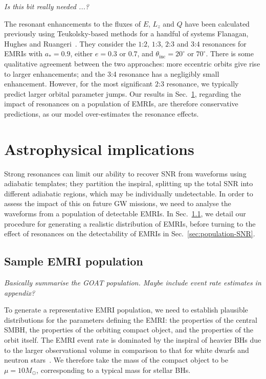 \documentclass[aps,prd,amsfonts,amssymb,amsmath,nofootinbib,showpacs,superscriptaddress,twocolumn]{revtex4}
\newcommand{\secref}[1]{Sec.~\ref{sec:#1}}
\newcommand{\sub}[1]{\ensuremath{_\mathrm{#1}}}
\begin{document}
\emph{Is this bit really needed ...?}

The resonant enhancements to the fluxes of $E$, $L_z$ and $Q$ have been calculated previously using Teukolsky-based methods for a handful of systems Flanagan, Hughes and Ruangeri~\cite{Flanagan2012a}. They consider the $1$:$2$, $1$:$3$, $2$:$3$ and $3$:$4$ resonances for EMRIs with $a_\ast=0.9$, either $e=0.3$ or $0.7$, and $\theta\sub{inc} = 20^\circ$ or $70^\circ$. There is some qualitative agreement between the two approaches: more eccentric orbits give rise to larger enhancements; and the 3:4 resonance has a negligibly small enhancement. However, for the most significant $2$:$3$ resonance, we typically predict larger orbital parameter jumps. Our results in \secref{astrophysics}, regarding the impact of resonances on a population of EMRIs, are therefore conservative predictions, as our model over-estimates the resonance effects.

\section{Astrophysical implications}
\label{sec:astrophysics}

Strong resonances can limit our ability to recover SNR from waveforms using adiabatic templates; they partition the inspiral, splitting up the total SNR into different adiabatic regions, which may be individually undetectable. In order to assess the impact of this on future GW missions, we need to analyse the waveforms from a population of detectable EMRIs. In \secref{EMRI-population}, we detail our procedure for generating a realistic distribution of EMRIs, before turning to the effect of resonances on the detectability of EMRIs in \secref{population-SNR}.

\subsection{Sample EMRI population}
\label{sec:EMRI-population}

\emph{Basically summarise the GOAT population. Maybe include event rate estimates in appendix?}

To generate a representative EMRI population, we need to establish plausible distributions for the parameters defining the EMRI: the properties of the central SMBH, the properties of the orbiting compact object, and the properties of the orbit itself. The EMRI event rate is dominated by the inspiral of heavier BHs due to the larger observational volume in comparison to that for white dwarfs and neutron stars~\cite{Gair2004}. We therefore take the mass of the compact object to be $\mu = 10 M_\odot$, corresponding to a typical mass for stellar BHs. 
\end{document}
